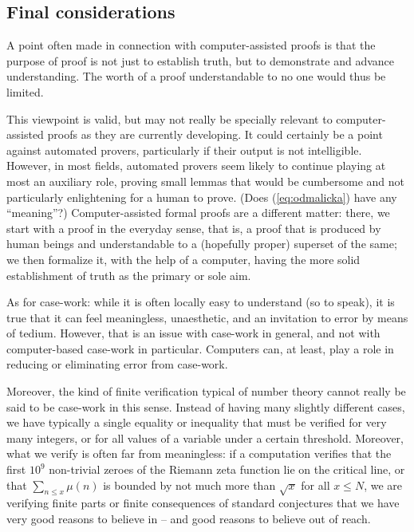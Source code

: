 \subsection{Final considerations}

A point often made in connection with computer-assisted proofs is that the
purpose of proof is not just to establish truth, but to demonstrate and
advance understanding. The worth of a proof understandable to no one
would thus be limited.

This viewpoint is valid, but may not really be specially relevant to
computer-assisted proofs as they are currently developing. It could certainly
be a point against automated provers, particularly if their output is not
intelligible. However, in most fields,
automated provers seem likely to continue playing at most an auxiliary role, 
proving small lemmas that would be cumbersome and not particularly
enlightening for a human to prove. (Does (\ref{eq:odmalicka}) have any
``meaning''?)
Computer-assisted formal proofs are a
different matter: there, we start with a proof in the everyday sense, that is,
a proof that is produced by human beings and understandable to a (hopefully
proper) superset of the same; we then formalize it, with the help of a computer,
having the more solid establishment of truth as the primary or sole aim.

As for case-work: while it is often locally easy to understand (so to
speak), it is true that it
can feel meaningless, unaesthetic, and an invitation to error by
means of tedium. However, that is an issue with case-work in general, and not
with computer-based case-work in particular. Computers can, at least, play
a role in reducing or eliminating error from case-work.

Moreover, the kind of finite verification typical of number theory
cannot really be said to be case-work in this sense. Instead of having many
slightly different cases, we have typically a single equality or inequality
that must be verified for very many integers, or for all values of a variable
under a certain threshold. Moreover, what we verify is often far from meaningless: if a computation verifies that the first $10^9$ non-trivial zeroes of the
Riemann zeta function lie on the critical line, or that $\sum_{n\leq x}
\mu(n)$ is bounded by not much more than $\sqrt{x}$ for all $x\leq N$,
we are verifying finite parts or finite consequences of standard conjectures
that we have very good reasons to believe in -- and good reasons
to believe out of reach.

